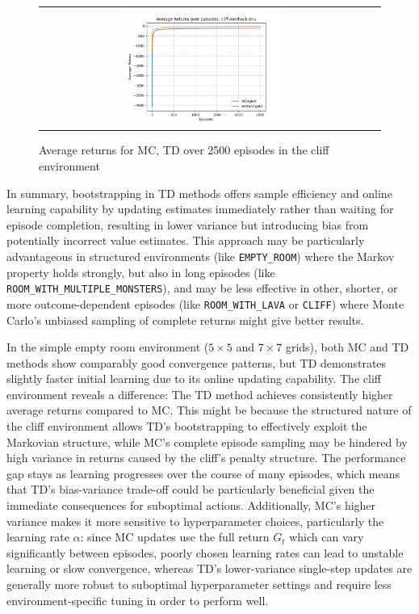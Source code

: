 \documentclass[12pt]{article}
\begin{document}
\begin{figure}[!h]
	\centering
	\begin{tabular}{cc}
		\includegraphics[width=0.48\textwidth]{figures/mc-td-cliff-env.png}
	\end{tabular}
	\caption{Average returns for MC, TD over 2500 episodes in the cliff environment}
	\label{fig:mc-td-cliff-env}
\end{figure}

In summary, bootstrapping in TD methods offers sample efficiency and online learning capability by updating estimates immediately rather than waiting for episode completion,
resulting in lower variance but introducing bias from potentially incorrect value estimates.
This approach may be particularly advantageous in structured environments (like \texttt{EMPTY\_ROOM}) where the Markov property holds strongly,
but also in long episodes (like \texttt{ROOM\_WITH\_MULTIPLE\_MONSTERS}),
and may be less effective in other, shorter, or more outcome-dependent episodes (like \texttt{ROOM\_WITH\_LAVA} or \texttt{CLIFF})
where Monte Carlo's unbiased sampling of complete returns might give better results.

In the simple empty room environment ($5 \times 5$ and $7 \times 7$ grids), both MC and TD methods show comparably good convergence patterns,
but TD demonstrates slightly faster initial learning due to its online updating capability.
The cliff environment reveals a difference:
The TD method achieves consistently higher average returns compared to MC.
This might be because the structured nature of the cliff environment allows TD's bootstrapping to effectively exploit the Markovian structure,
while MC's complete episode sampling may be hindered by high variance in returns caused by the cliff's penalty structure.
The performance gap stays as learning progresses over the course of many episodes,
which means that TD's bias-variance trade-off could be particularly beneficial given the immediate consequences for suboptimal actions.
Additionally, MC's higher variance makes it more sensitive to hyperparameter choices, particularly the learning rate $\alpha$:
since MC updates use the full return $G_t$ which can vary significantly between episodes,
poorly chosen learning rates can lead to unstable learning or slow convergence,
whereas TD's lower-variance single-step updates are generally more robust to suboptimal hyperparameter settings and require less environment-specific tuning in order to perform well.
\end{document}
